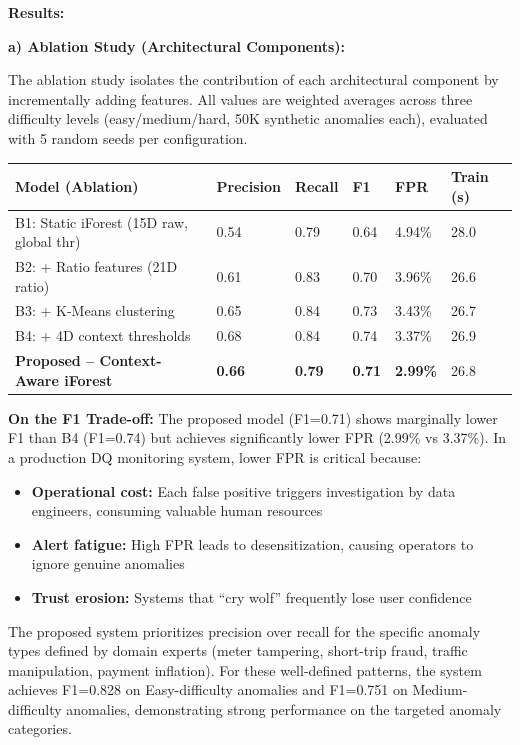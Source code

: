 \textbf{Results:}

\textbf{a) Ablation Study (Architectural Components):}

The ablation study isolates the contribution of each architectural component by incrementally adding features. All values are weighted averages across three difficulty levels (easy/medium/hard, 50K synthetic anomalies each), evaluated with 5 random seeds per configuration.

\begin{longtable}{|m{4.5cm}|m{1.5cm}|m{1.5cm}|m{1.5cm}|m{1.5cm}|m{2cm}|}
\hline
\textbf{Model (Ablation)} & \textbf{Precision} & \textbf{Recall} & \textbf{F1} & \textbf{FPR} & \textbf{Train (s)} \\ \hline
B1: Static iForest (15D raw, global thr) & 0.54 & 0.79 & 0.64 & 4.94\% & 28.0 \\ \hline
B2: + Ratio features (21D ratio) & 0.61 & 0.83 & 0.70 & 3.96\% & 26.6 \\ \hline
B3: + K-Means clustering & 0.65 & 0.84 & 0.73 & 3.43\% & 26.7 \\ \hline
B4: + 4D context thresholds & 0.68 & 0.84 & 0.74 & 3.37\% & 26.9 \\ \hline
\textbf{Proposed -- Context-Aware iForest} & \textbf{0.66} & \textbf{0.79} & \textbf{0.71} & \textbf{2.99\%} & 26.8 \\ \hline
\end{longtable}

\textbf{On the F1 Trade-off:} The proposed model (F1=0.71) shows marginally lower F1 than B4 (F1=0.74) but achieves significantly lower FPR (2.99\% vs 3.37\%). In a production DQ monitoring system, lower FPR is critical because:
\begin{itemize}
    \item \textbf{Operational cost:} Each false positive triggers investigation by data engineers, consuming valuable human resources
    \item \textbf{Alert fatigue:} High FPR leads to desensitization, causing operators to ignore genuine anomalies
    \item \textbf{Trust erosion:} Systems that ``cry wolf'' frequently lose user confidence
\end{itemize}

The proposed system prioritizes precision over recall for the specific anomaly types defined by domain experts (meter tampering, short-trip fraud, traffic manipulation, payment inflation). For these well-defined patterns, the system achieves F1=0.828 on Easy-difficulty anomalies and F1=0.751 on Medium-difficulty anomalies, demonstrating strong performance on the targeted anomaly categories.

